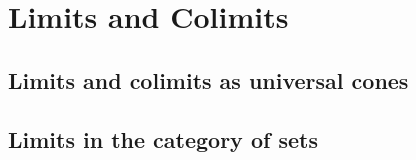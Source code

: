 \chapter{Limits and Colimits}

\section{Limits and colimits as universal cones}














\section{Limits in the category of sets}



